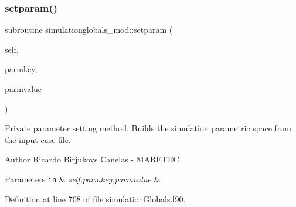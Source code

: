 \subsubsection{\texorpdfstring{setparam()}{setparam()}}
{\footnotesize\ttfamily subroutine simulationglobals\+\_\+mod\+::setparam (\begin{DoxyParamCaption}\item[{class(\mbox{\hyperlink{structsimulationglobals__mod_1_1parameters__t}{parameters\+\_\+t}}), intent(inout)}]{self,  }\item[{type(string), intent(in)}]{parmkey,  }\item[{type(string), intent(in)}]{parmvalue }\end{DoxyParamCaption})\hspace{0.3cm}{\ttfamily [private]}}



Private parameter setting method. Builds the simulation parametric space from the input case file. 

\begin{DoxyAuthor}{Author}
Ricardo Birjukovs Canelas -\/ M\+A\+R\+E\+T\+EC 
\end{DoxyAuthor}

\begin{DoxyParams}[1]{Parameters}
\mbox{\tt in}  & {\em self,parmkey,parmvalue} & \\
\hline
\end{DoxyParams}


Definition at line 708 of file simulation\+Globals.\+f90.


